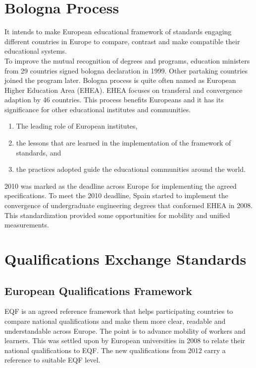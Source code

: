 \documentclass[12pt,a4paper,oneside]{book}
\begin{document}
\section{Bologna Process}

It intends to make European educational framework of standards engaging different countries in Europe to compare, contrast and make compatible their educational systems. \cite{bologna process} \\

To improve the mutual recognition of degrees and programs, education ministers from 29 countries signed bologna declaration in 1999. Other partaking countries joined the program later. \cite{improvement bologna process} Bologna process is quite often named as European Higher Education Area (EHEA). EHEA focuses on transferal and convergence adaption by 46 countries. This process benefits Europeans and it has its significance for other educational institutes and communities.

	\begin{enumerate}

		\item The leading role of European institutes,

		\item the lessons that are learned in the implementation of the framework of standards, and
	
		\item the practices adopted guide the educational communities around the world.

	\end{enumerate} 

	2010 was marked as the deadline across Europe for implementing the agreed specifications. \cite{EHEA} To meet the 2010 deadline, Spain started to implement the convergence of undergraduate engineering degrees that conformed EHEA in 2008. This standardization provided some opportunities for mobility and unified measurements. \cite{EHEA} \\

\section{Qualifications Exchange Standards}

    \subsection{European Qualifications Framework}
    EQF is an agreed reference framework that helps participating countries to compare national qualifications and make them more clear, readable and understandable across Europe. The point is to advance mobility of workers and learners. This was settled upon by European universities in 2008 to relate their national qualifications to EQF. The new qualifications from 2012 carry a reference to suitable EQF level. \\
\end{document}
